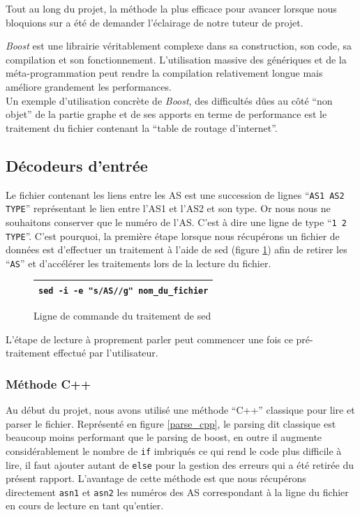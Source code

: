 Tout au long du projet, la méthode la plus efficace pour avancer lorsque nous bloquions sur \boost a été de demander l'éclairage de notre tuteur de projet. 

\textit{Boost} est une librairie véritablement complexe dans sa construction, son code, sa compilation et son fonctionnement. L'utilisation massive des génériques et de la méta-programmation peut rendre la compilation relativement longue mais améliore grandement les performances.
~\\
Un exemple d'utilisation  concrète de \textit{Boost}, des difficultés dûes au côté ``non objet'' de la partie graphe et de ses apports en terme de performance est le traitement du fichier contenant la ``table de routage d'internet''.

\subsection{Décodeurs d'entrée}
Le fichier contenant les liens entre les AS est une succession de lignes ``\verb|AS1 AS2 TYPE|'' représentant le lien entre l'AS1 et l'AS2 et son type. Or nous nous ne souhaitons conserver que le numéro de l'AS. C'est à dire une ligne de type ``\verb|1 2 TYPE|''. C'est pourquoi, la première étape lorsque nous récupérons un fichier de données est d'effectuer un traitement à l'aide de sed (figure \ref{sed}) afin de retirer les ``\verb|AS|'' et d'accélérer les traitements lors de la lecture du fichier. 
\begin{figure}[H]
   \begin{center}
      \begin{tabular}{l}
         \hline
         \verb|sed -i -e "s/AS//g" nom_du_fichier|\\
         \hline
      \end{tabular}
   \end{center}
\caption{\label{sed} Ligne de commande du traitement de sed}
\end{figure}

L'étape de lecture à proprement parler peut commencer une fois ce pré-traitement effectué par l'utilisateur. 

\subsubsection{Méthode C++}

Au début du projet, nous avons utilisé une méthode ``C++'' classique pour lire et parser le fichier. 
Représenté en figure \ref{parse_cpp}, le parsing dit classique est beaucoup moins performant que le parsing de boost, en outre il augmente considérablement le nombre de \verb|if| imbriqués ce qui rend le code plus difficile à lire, il faut ajouter autant de \verb|else| pour la gestion des erreurs qui a été retirée du présent rapport. L'avantage de cette méthode est que nous récupérons directement \verb|asn1| et \verb|asn2| les numéros des AS correspondant à la ligne du fichier en cours de lecture en tant qu'entier.


